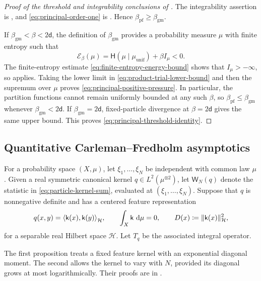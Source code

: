 \documentclass[11pt,reqno]{amsart}
\numberwithin{equation}{section}
\theoremstyle{plain}
\theoremstyle{definition}
\DeclarePairedDelimiter{\norm}{\lVert}{\rVert}
\DeclarePairedDelimiter{\ip}{\langle}{\rangle}
\renewcommand{\d}{\mathsf d}
\newcommand{\dd}{\mathop{}\!\mathrm d}
\newcommand{\be}{\beta}
\newcommand{\Hr}{\mathsf H}
\newcommand{\Ec}{\mathcal E}
\newcommand{\muunif}{\mu_{\mathrm{unif}}}
\newcommand{\gm}{\mathrm{gm}}
\newcommand{\pf}{\mathrm{pf}}
\begin{document}
\begin{proof}[Proof of the threshold and integrability conclusions of ]
The integrability assertion is , and \eqref{eq:principal-order-one} is .  Hence $\beta_{\pf}\geq\beta_{\gm}$.

If $\beta_{\gm}<\be<2\d$, the definition of $\beta_{\gm}$ provides a probability measure $\mu$ with finite entropy such that
\begin{equation}
 \Ec_{\be}(\mu)=\Hr(\mu\mid\muunif)+\be I_{\mu}<0.
 \label{eq:strict-free-energy-competitor}
\end{equation}
The finite-entropy estimate \eqref{eq:finite-entropy-energy-bound} shows that $I_{\mu}>-\infty$, so  applies.  Taking the lower limit in \eqref{eq:product-trial-lower-bound} and then the supremum over $\mu$ proves \eqref{eq:principal-positive-pressure}.  In particular, the partition functions cannot remain uniformly bounded at any such $\be$, so $\beta_{\pf}\leq\beta_{\gm}$ whenever $\beta_{\gm}<2\d$.  If $\beta_{\gm}=2\d$, fixed-particle divergence at $\be=2\d$ gives the same upper bound.  This proves \eqref{eq:principal-threshold-identity}.
\end{proof}

\subsection{Quantitative Carleman--Fredholm asymptotics}
\label{subsec:homogeneous-determinant-rate}

For a probability space $(X,\mu)$, let $\xi_1,\ldots,\xi_N$ be independent with common law $\mu$.  Given a real symmetric canonical kernel $q\in L^2(\mu^{\otimes2})$, let $\mathsf W_N(q)$ denote the statistic in \eqref{eq:particle-kernel-sum}, evaluated at $(\xi_1,\ldots,\xi_N)$.
Suppose that $q$ is nonnegative definite and has a centered feature representation
\begin{equation}
 q(x,y)=\ip*{\mathsf k(x),\mathsf k(y)}_{\mathcal H},
 \qquad
 \int_X\mathsf k\,\dd\mu=0,
 \qquad
 D(x)\coloneqq\norm{\mathsf k(x)}_{\mathcal H}^2,
 \label{eq:centered-feature-representation}
\end{equation}
for a separable real Hilbert space $\mathcal H$.  Let $T_q$ be the associated integral operator.

The first proposition treats a fixed feature kernel with an exponential diagonal moment. The second allows the kernel to vary with $N$, provided its diagonal grows at most logarithmically. Their proofs are in .
\end{document}
